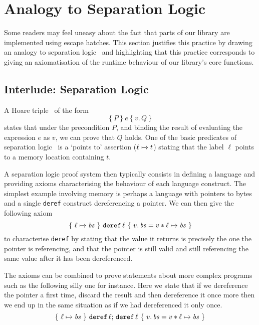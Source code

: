 \section{Analogy to Separation Logic}\label{appendix:hoare}

Some readers may feel uneasy about the fact that parts of our
library are implemented using \idris{} escape hatches.
%
This section justifies this practice by drawing an analogy to
separation logic~\citep{DBLP:journals/cacm/OHearn19,DBLP:books/hal/Chargueraud23,MANUAL:book/sfoundations/Chargueraud23}
and highlighting that this practice corresponds
to giving an axiomatisation of the runtime behaviour of our
library's core functions.

\newcommand{\Pointer}[3]{\ensuremath{#1 \xmapsto{#2} #3}}
\newcommand{\Hoare}[4]{\ensuremath{\lbrace~ #1 ~\rbrace~ #2 ~\lbrace~ #3.\, #4 ~\rbrace}}
\newcommand{\Meaning}[2]{\ensuremath{\llbracket \,#1\, \rrbracket\, (\Mu{#2})}}
\newcommand{\Mu}[1]{\ensuremath{\mu \, \mathit{#1}}}

\subsection{Interlude: Separation Logic}

A Hoare triple~\citep{DBLP:journals/cacm/Hoare69} of the form
\[ \Hoare{P}{e}{v}{Q} \]
states that under the precondition
$P$, and binding the result of evaluating the expression $e$ as $v$,
we can prove that $Q$ holds.
%
One of the basic predicates of separation logic~\citep{DBLP:conf/lics/Reynolds02}
is a `points to' assertion (\Pointer{\ell}{}{t}) stating that
the label $\ell$ points to a memory location containing $t$.

A separation logic proof system then typically consists in defining
a language and providing axioms characterising the behaviour of
each language construct.
%
The simplest example involving memory is perhaps a language
with pointers to bytes and a single \texttt{deref} construct
dereferencing a pointer.
%
We can then give the following axiom
\[ \Hoare{\Pointer{\ell}{}{\mathit{bs}}}{\texttt{deref}\,\ell}{v}{\mathit{bs} = v \ast \Pointer{\ell}{}{\mathit{bs}}} \]
to characterise \texttt{deref} by stating that the value
it returns is precisely the one the pointer is referencing,
and that the pointer is still valid and still referencing
the same value after it has been dereferenced.

The axioms can be combined to prove statements about more
complex programs such as the following silly one for instance.
Here we state that if we dereference the pointer a first time,
discard the result and then dereference it once more then we
end up in the same situation as if we had dereferenced it only once.
\[ \Hoare{\Pointer{\ell}{}{\mathit{bs}}}{\texttt{deref}\,\ell;\, \texttt{deref}\,\ell}{v}{\mathit{bs} = v \ast \Pointer{\ell}{}{\mathit{bs}}} \]

